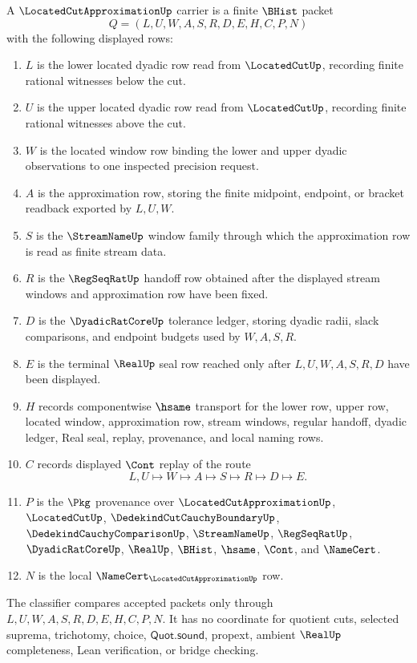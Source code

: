 \begin{definition}
\label{def:located-cut-approximation-carrier}
A $\LocatedCutApproximationUp$ carrier is a finite $\BHist$ packet
$$
Q=(L,U,W,A,S,R,D,E,H,C,P,N)
$$
with the following displayed rows:
\begin{enumerate}
\item $L$ is the lower located dyadic row read from $\LocatedCutUp$, recording finite rational witnesses below the cut.
\item $U$ is the upper located dyadic row read from $\LocatedCutUp$, recording finite rational witnesses above the cut.
\item $W$ is the located window row binding the lower and upper dyadic observations to one inspected precision request.
\item $A$ is the approximation row, storing the finite midpoint, endpoint, or bracket readback exported by $L,U,W$.
\item $S$ is the $\StreamNameUp$ window family through which the approximation row is read as finite stream data.
\item $R$ is the $\RegSeqRatUp$ handoff row obtained after the displayed stream windows and approximation row have been fixed.
\item $D$ is the $\DyadicRatCoreUp$ tolerance ledger, storing dyadic radii, slack comparisons, and endpoint budgets used by $W,A,S,R$.
\item $E$ is the terminal $\RealUp$ seal row reached only after $L,U,W,A,S,R,D$ have been displayed.
\item $H$ records componentwise $\hsame$ transport for the lower row, upper row, located window, approximation row, stream windows, regular handoff, dyadic ledger, Real seal, replay, provenance, and local naming rows.
\item $C$ records displayed $\Cont$ replay of the route
$$
L,U \longmapsto W \longmapsto A \longmapsto S \longmapsto R \longmapsto D \longmapsto E .
$$
\item $P$ is the $\Pkg$ provenance over $\LocatedCutApproximationUp$, $\LocatedCutUp$, $\DedekindCutCauchyBoundaryUp$, $\DedekindCauchyComparisonUp$, $\StreamNameUp$, $\RegSeqRatUp$, $\DyadicRatCoreUp$, $\RealUp$, $\BHist$, $\hsame$, $\Cont$, and $\NameCert$.
\item $N$ is the local $\NameCert_{\LocatedCutApproximationUp}$ row.
\end{enumerate}
The classifier compares accepted packets only through $L,U,W,A,S,R,D,E,H,C,P,N$. It has no coordinate for quotient cuts, selected suprema, trichotomy, choice, $\mathsf{Quot.sound}$, propext, ambient $\RealUp$ completeness, Lean verification, or bridge checking.
\end{definition}

